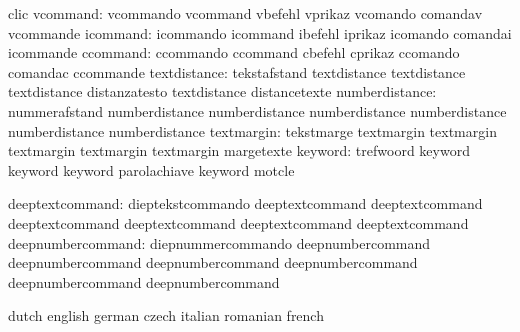                            clic
                 vcommand: vcommando                 vcommand
                           vbefehl                   vprikaz
                           vcomando                  comandav
                           vcommande
                 icommand: icommando                 icommand
                           ibefehl                   iprikaz
                           icomando                  comandai
                           icommande
                 ccommand: ccommando                 ccommand
                           cbefehl                   cprikaz
                           ccomando                  comandac
                           ccommande
             textdistance: tekstafstand              textdistance
                           textdistance              textdistance
                           distanzatesto             textdistance
                           distancetexte
           numberdistance: nummerafstand             numberdistance
                           numberdistance            numberdistance
                           numberdistance            numberdistance
                           numberdistance
               textmargin: tekstmarge                textmargin
                           textmargin                textmargin
                           textmargin                textmargin
                           margetexte
                  keyword: trefwoord                 keyword
                           keyword                   keyword
                           parolachiave              keyword
                           motcle

          deeptextcommand: dieptekstcommando         deeptextcommand
                           deeptextcommand           deeptextcommand
                           deeptextcommand           deeptextcommand
                           deeptextcommand
        deepnumbercommand: diepnummercommando        deepnumbercommand
                           deepnumbercommand         deepnumbercommand
                           deepnumbercommand         deepnumbercommand
                           deepnumbercommand

\stopconstants


\startconstants            dutch                     english
                           german                    czech
                           italian                   romanian
                           french


